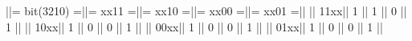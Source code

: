 \begin{textcode}
||= bit(3210) =||=  xx11 =||=  xx10 =||=  xx00 =||=  xx01 =||
||         11xx||      1  ||      1  ||      0  ||      1  ||
||         10xx||      1  ||      0  ||      0  ||      1  ||
||         00xx||      1  ||      0  ||      0  ||      1  ||
||         01xx||      1  ||      0  ||      0  ||      1  ||
\end{textcode}


